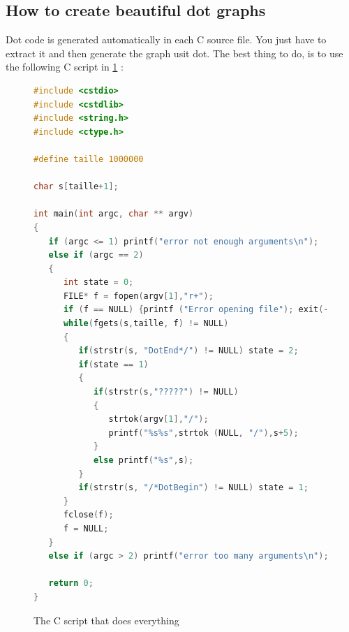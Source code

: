 \subsection{How to create beautiful dot graphs}
Dot code is generated automatically in each C source file. You just have to extract it and then generate the graph usit dot.
The best thing to do, is to use the following C script in \ref{fig:scriptdot} :
\begin{figure}[!htb]
\begin{lstlisting}[language=C]
#include <cstdio>
#include <cstdlib>
#include <string.h>
#include <ctype.h>

#define taille 1000000

char s[taille+1];

int main(int argc, char ** argv)
{
   if (argc <= 1) printf("error not enough arguments\n");
   else if (argc == 2) 
   {
      int state = 0;
      FILE* f = fopen(argv[1],"r+");
      if (f == NULL) {printf ("Error opening file"); exit(-1);}
      while(fgets(s,taille, f) != NULL)
      {
         if(strstr(s, "DotEnd*/") != NULL) state = 2;
         if(state == 1) 
         {
            if(strstr(s,"?????") != NULL)
            {   
               strtok(argv[1],"/");
               printf("%s%s",strtok (NULL, "/"),s+5);
            }
            else printf("%s",s);
         }
         if(strstr(s, "/*DotBegin") != NULL) state = 1;
      }
      fclose(f);
      f = NULL;
   }
   else if (argc > 2) printf("error too many arguments\n"); 

   return 0;
}

\end{lstlisting}
\caption{The C script that does everything}
\label{fig:scriptdot}
\end{figure}